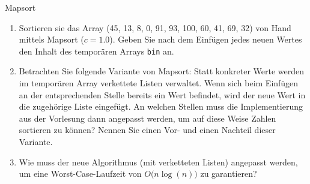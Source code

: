 \documentclass[11pt,a4paper]{article}
\begin{document}
\begin{aufgabe}{2}{Mapsort}
    \begin{enumerate}
        \item 
        Sortieren sie das Array (45, 13, 8, 0, 91, 93, 100, 60, 41, 69, 32) von Hand mittels Mapsort ($c = 1.0$).
        Geben Sie nach dem Einfügen jedes neuen Wertes den Inhalt des temporären Arrays \texttt{bin} an.

        \item
        Betrachten Sie folgende Variante von Mapsort:
        Statt konkreter Werte werden im temporären Array verkettete Listen verwaltet.
        Wenn sich beim Einfügen an der entsprechenden Stelle bereits ein Wert befindet, wird der neue Wert in die zugehörige Liste eingefügt.
        An welchen Stellen muss die Implementierung aus der Vorlesung dann angepasst werden, um auf diese Weise Zahlen sortieren zu können?
        Nennen Sie einen Vor- und einen Nachteil dieser Variante.
        
        \item
        Wie muss der neue Algorithmus (mit verketteten Listen) angepasst werden, um eine Worst-Case-Laufzeit von $O\big(n \log(n)\big)$ zu garantieren?
    \end{enumerate}
\end{aufgabe}
\end{document}
